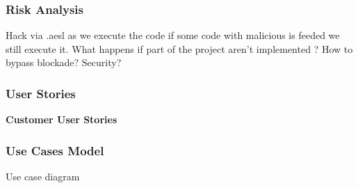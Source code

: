 \documentclass{scrartcl}
\begin{document}
\subsubsection{Risk Analysis}
Hack via .aesl as we execute the code if some code with malicious is feeded we still execute it.
What happens if part of the project aren't implemented ? How to bypass blockade? Security?

\subsubsection{User Stories}
\textbf{\large Customer User Stories}

\subsubsection{Use Cases Model}
Use case diagram
\end{document}
